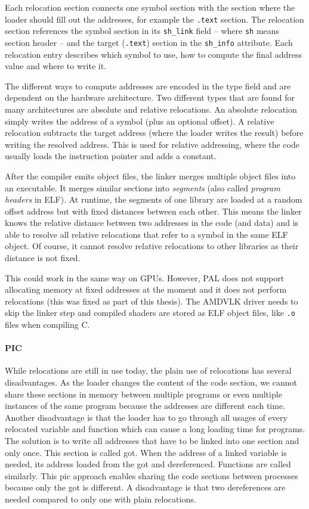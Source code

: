 Each relocation section connects one symbol section with the section where the loader should fill out the addresses, for example the \texttt{.text} section. The relocation section references the symbol section in its \texttt{sh\_link} field -- where \texttt{sh} means section header -- and the target (\texttt{.text}) section in the \texttt{sh\_info} attribute. Each relocation entry describes which symbol to use, how to compute the final address value and where to write it.

The different ways to compute addresses are encoded in the type field and are dependent on the hardware architecture. Two different types that are found for many architectures are absolute and relative relocations. An absolute relocation simply writes the address of a symbol (plus an optional offset). A relative relocation subtracts the target address (where the loader writes the result) before writing the resolved address. This is used for relative addressing, where the code usually loads the instruction pointer and adds a constant.~\cite{BenderskyRelocations}

After the compiler emits object files, the linker merges multiple object files into an executable. It merges similar sections into \emph{segments} (also called \emph{program headers} in ELF). At runtime, the segments of one library are loaded at a random offset address but with fixed distances between each other. This means the linker knows the relative distance between two addresses in the code (and data) and is able to resolve all relative relocations that refer to a symbol in the same ELF object. Of course, it cannot resolve relative relocations to other libraries as their distance is not fixed.

This could work in the same way on GPUs. However, PAL does not support allocating memory at fixed addresses at the moment and it does not perform relocations (this was fixed as part of this thesis). The AMDVLK driver needs to skip the linker step and compiled shaders are stored as ELF object files, like \texttt{.o} files when compiling C.

\paragraph{PIC} While relocations are still in use today, the plain use of relocations has several disadvantages. As the loader changes the content of the code section, we cannot share these sections in memory between multiple programs or even multiple instances of the same program because the addresses are different each time. Another disadvantage is that the loader has to go through all usages of every relocated variable and function which can cause a long loading time for programs. The solution is to write all addresses that have to be linked into one section and only once. This section is called \gls{got}. When the address of a linked variable is needed, its address loaded from the \gls{got} and dereferenced. Functions are called similarly. This \gls{pic} approach enables sharing the code sections between processes because only the \gls{got} is different. A disadvantage is that two dereferences are needed compared to only one with plain relocations.~\cite{BenderskyPic}

